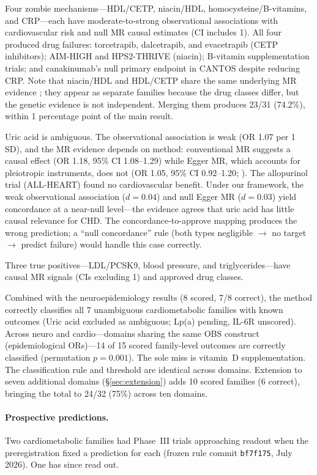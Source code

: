 \documentclass[11pt]{article}
\begin{document}
Four zombie mechanisms---HDL/CETP, niacin/HDL, homocysteine/B-vitamins, and CRP---each have moderate-to-strong observational associations with cardiovascular risk and null MR causal estimates (CI includes 1). All four produced drug failures: torcetrapib, dalcetrapib, and evacetrapib (CETP inhibitors); AIM-HIGH and HPS2-THRIVE (niacin); B-vitamin supplementation trials; and canakinumab's null primary endpoint in CANTOS despite reducing CRP. Note that niacin/HDL and HDL/CETP share the same underlying MR evidence \cite{voight2012}; they appear as separate families because the drug classes differ, but the genetic evidence is not independent. Merging them produces 23/31 (74.2\%), within 1 percentage point of the main result.

Uric acid is ambiguous. The observational association is weak (OR 1.07 per 1 SD), and the MR evidence depends on method: conventional MR suggests a causal effect (OR 1.18, 95\% CI 1.08--1.29) while Egger MR, which accounts for pleiotropic instruments, does not (OR 1.05, 95\% CI 0.92--1.20; \cite{white2016}). The allopurinol trial (ALL-HEART) found no cardiovascular benefit. Under our framework, the weak observational association ($d = 0.04$) and null Egger MR ($d = 0.03$) yield concordance at a near-null level---the evidence agrees that uric acid has little causal relevance for CHD. The concordance-to-approve mapping produces the wrong prediction; a ``null concordance'' rule (both types negligible $\to$ no target $\to$ predict failure) would handle this case correctly.

Three true positives---LDL/PCSK9, blood pressure, and triglycerides---have causal MR signals (CIs excluding 1) and approved drug classes.

Combined with the neuroepidemiology results (8 scored, 7/8 correct), the method correctly classifies all 7 unambiguous cardiometabolic families with known outcomes (Uric acid excluded as ambiguous; Lp(a) pending, IL-6R unscored). Across neuro and cardio---domains sharing the same OBS construct (epidemiological ORs)---14 of 15 scored family-level outcomes are correctly classified (permutation $p = 0.001$). The sole miss is vitamin~D supplementation. The classification rule and threshold are identical across domains. Extension to seven additional domains (\S\ref{sec:extension}) adds 10 scored families (6 correct), bringing the total to 24/32 (75\%) across ten domains.

\paragraph{Prospective predictions.}
\label{par:prospective}
Two cardiometabolic families had Phase~III trials approaching readout when the preregistration fixed a prediction for each (frozen rule commit \texttt{bf7f175}, July 2026). One has since read out.
\end{document}
